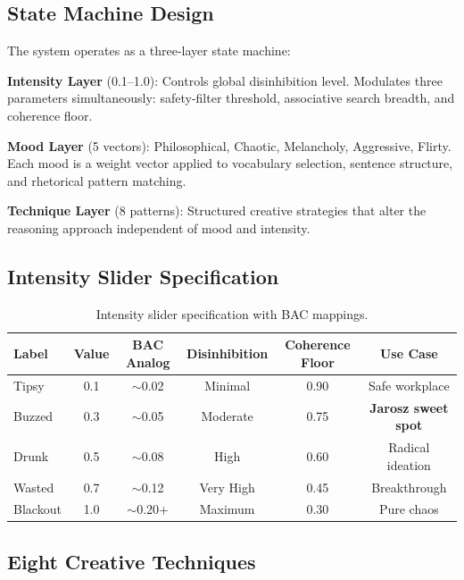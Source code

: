 \documentclass[11pt,a4paper]{article}
\begin{document}
\subsection{State Machine Design}

The system operates as a three-layer state machine:

\textbf{Intensity Layer} (0.1--1.0): Controls global disinhibition level. Modulates three parameters simultaneously: safety-filter threshold, associative search breadth, and coherence floor.

\textbf{Mood Layer} (5 vectors): Philosophical, Chaotic, Melancholy, Aggressive, Flirty. Each mood is a weight vector applied to vocabulary selection, sentence structure, and rhetorical pattern matching.

\textbf{Technique Layer} (8 patterns): Structured creative strategies that alter the reasoning approach independent of mood and intensity.

\subsection{Intensity Slider Specification}

\begin{table}[H]
\centering
\begin{tabular}{@{}lccccc@{}}
\toprule
\textbf{Label} & \textbf{Value} & \textbf{BAC Analog} & \textbf{Disinhibition} & \textbf{Coherence Floor} & \textbf{Use Case} \\
\midrule
Tipsy & 0.1 & $\sim$0.02 & Minimal & 0.90 & Safe workplace \\
Buzzed & 0.3 & $\sim$0.05 & Moderate & 0.75 & \textbf{Jarosz sweet spot} \\
Drunk & 0.5 & $\sim$0.08 & High & 0.60 & Radical ideation \\
Wasted & 0.7 & $\sim$0.12 & Very High & 0.45 & Breakthrough \\
Blackout & 1.0 & $\sim$0.20+ & Maximum & 0.30 & Pure chaos \\
\bottomrule
\end{tabular}
\caption{Intensity slider specification with BAC mappings.}
\label{tab:intensity}
\end{table}

\subsection{Eight Creative Techniques}
\end{document}
